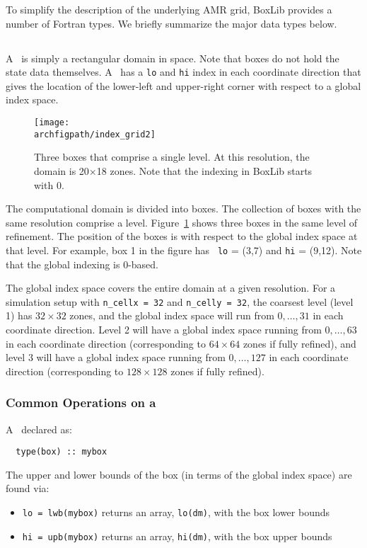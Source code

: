 To simplify the description of the underlying AMR grid, BoxLib
provides a number of Fortran types.  We briefly summarize the major
data types below.


\subsection{\boxtype}

A \boxtype\ is simply a rectangular domain in space.  Note that boxes
do not hold the state data themselves.  A \boxtype\ has a {\tt lo} 
and {\tt hi} index in each coordinate direction that gives the
location of the lower-left and upper-right corner with respect to
a global index space.  

\begin{figure}[t]
\centering
\texttt{[image: \\archfigpath/index\_grid2]}
\caption[Single-level grid structure]
{\label{fig:boxes} Three boxes that comprise a single level.  At this
  resolution, the domain is 20$\times$18 zones.  Note that the
  indexing in BoxLib starts with $0$.}
\end{figure}


The computational domain is divided into boxes.  The collection of
boxes with the same resolution comprise a level.
Figure~\ref{fig:boxes} shows three boxes in the same level of
refinement.  The position of the boxes is with respect to the global
index space at that level.  For example, box 1 in the figure has {\tt
  lo} = (3,7) and {\tt hi} = (9,12).  Note that the global indexing
is 0-based.

The global index space covers the entire domain at a given resolution.
For a simulation setup with {\tt n\_cellx = 32} and {\tt n\_celly =
  32}, the coarsest level (level 1) has $32 \times 32$ zones, and the
global index space will run from $0, \ldots, 31$ in each coordinate
direction.  Level 2 will have a global index space running from $0,
\ldots, 63$ in each coordinate direction (corresponding to $64 \times
64$ zones if fully refined), and level 3 will have a global index
space running from $0, \ldots, 127$ in each coordinate direction
(corresponding to $128\times 128$ zones if fully refined).


\subsubsection{Common Operations on a \boxtype}

A \boxtype\ declared as:
\begin{verbatim}
  type(box) :: mybox
\end{verbatim}
%
The upper and lower bounds of the box (in terms of the global
index space) are found via:
\begin{itemize}

\item {\tt lo = lwb(mybox)} returns an array, {\tt lo(dm)}, with
     the box lower bounds

\item {\tt hi = upb(mybox)} returns an array, {\tt hi(dm)}, with
     the box upper bounds

\end{itemize}





